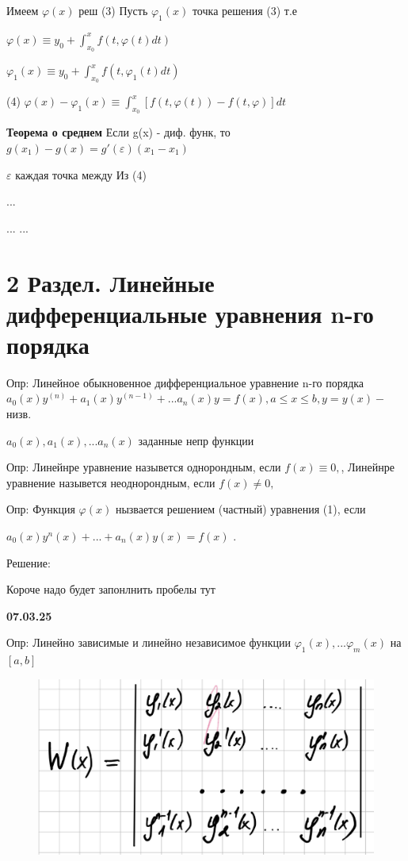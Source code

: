\documentclass{article}
\begin{document}
Имеем $\varphi(x)$ реш (3)
Пусть $\varphi_1(x)$ точка решения (3)
т.е 

$\varphi(x) \equiv y_0 + \int_{x_0}^{x}f(t,\varphi(t)dt)$

$\varphi_1(x) \equiv y_0 + \int_{x_0}^{x}f(t,\varphi_1(t)dt)$

(4) $\varphi(x) - \varphi_1(x) \equiv \int_{x_0}^{x} \left[f(t,\varphi(t)) - f(t,\varphi)\right]dt$







\textbf{Теорема о среднем}
Если g(x) - диф. функ,
то $g(x_1) - g(x) = g'(\varepsilon )(x_1-x_1)$

$\varepsilon$ каждая точка между
Из (4)



...

...
...

\section{2 Раздел. Линейные дифференциальные уравнения n-го порядка}

Опр: Линейное обыкновенное дифференциальное уравнение n-го порядка
$a_0(x)y^{(n)}+a_1(x)y^{(n-1)} + ... a_n (x)y = f(x), a\leq x\leq b, y=y(x) - $ низв.

$a_0(x),a_1(x),...a_n(x)$ заданные непр функции



Опр: Линейнре уравнение назывется однорондным, если $f(x) \equiv 0,$,
Линейнре уравнение назывется неоднорондным, если $f(x) \neq  0,$

Опр: Функция $\varphi(x)$ нызвается решением (частный) уравнения (1), если 

$a_0(x)y^n(x)+...+a_n(x)y(x) = f(x)  $ .

Решение:

Короче надо будет запонлнить пробелы тут


\textbf{07.03.25}

Опр: Линейно зависимые и линейно независимое функции 
$\varphi_1(x),... \varphi_m(x)$ на $[a,b]$

\begin{figure}[H]
    \centering
    \includegraphics[width=0.25\linewidth]{Снимок экрана 2025-03-07 100524.png}
\end{figure}
\end{document}
